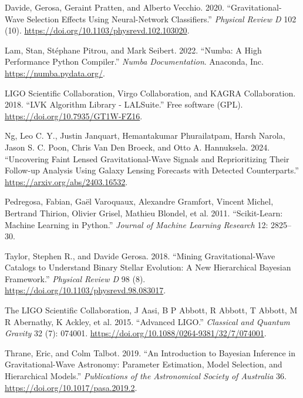 \documentclass[10pt,a4paper,onecolumn]{article}
\newlength{\cslhangindent}
\newenvironment{CSLReferences}[3] %
 {%
  \setlength{\parindent}{0pt}
  \ifodd #1 \everypar{\setlength{\hangindent}{\cslhangindent}}\ignorespaces\fi
  \ifnum #2 > 0
  \setlength{\parskip}{#2\baselineskip}
  \fi
 }%
 {}
\begin{document}
\begin{CSLReferences}{1}{0}
\bibitem[\citeproctext]{ref-Gerosa:2020}
Davide, Gerosa, Geraint Pratten, and Alberto Vecchio. 2020.
{``Gravitational-Wave Selection Effects Using Neural-Network
Classifiers.''} \emph{Physical Review D} 102 (10).
\url{https://doi.org/10.1103/physrevd.102.103020}.

Lam, Stan, Stéphane Pitrou, and Mark Seibert. 2022. {``Numba: A High
Performance Python Compiler.''} \emph{Numba Documentation}. Anaconda,
Inc. \url{https://numba.pydata.org/}.

LIGO Scientific Collaboration, Virgo Collaboration, and KAGRA
Collaboration. 2018. {``{LVK} {A}lgorithm {L}ibrary - {LALS}uite.''}
Free software (GPL). \url{https://doi.org/10.7935/GT1W-FZ16}.

Ng, Leo C. Y., Justin Janquart, Hemantakumar Phurailatpam, Harsh Narola,
Jason S. C. Poon, Chris Van Den Broeck, and Otto A. Hannuksela. 2024.
{``Uncovering Faint Lensed Gravitational-Wave Signals and Reprioritizing
Their Follow-up Analysis Using Galaxy Lensing Forecasts with Detected
Counterparts.''} \url{https://arxiv.org/abs/2403.16532}.

Pedregosa, Fabian, Gaël Varoquaux, Alexandre Gramfort, Vincent Michel,
Bertrand Thirion, Olivier Grisel, Mathieu Blondel, et al. 2011.
{``Scikit-Learn: Machine Learning in {P}ython.''} \emph{Journal of
Machine Learning Research} 12: 2825--30.

Taylor, Stephen R., and Davide Gerosa. 2018. {``Mining
Gravitational-Wave Catalogs to Understand Binary Stellar Evolution: A
New Hierarchical Bayesian Framework.''} \emph{Physical Review D} 98 (8).
\url{https://doi.org/10.1103/physrevd.98.083017}.

The LIGO Scientific Collaboration, J Aasi, B P Abbott, R Abbott, T
Abbott, M R Abernathy, K Ackley, et al. 2015. {``Advanced LIGO.''}
\emph{Classical and Quantum Gravity} 32 (7): 074001.
\url{https://doi.org/10.1088/0264-9381/32/7/074001}.

Thrane, Eric, and Colm Talbot. 2019. {``An Introduction to Bayesian
Inference in Gravitational-Wave Astronomy: Parameter Estimation, Model
Selection, and Hierarchical Models.''} \emph{Publications of the
Astronomical Society of Australia} 36.
\url{https://doi.org/10.1017/pasa.2019.2}.

\end{CSLReferences}
\end{document}
